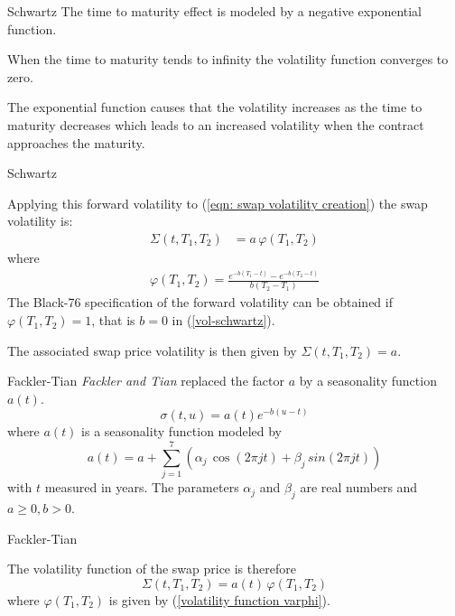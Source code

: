 {Schwartz}
The time to maturity effect is modeled by a negative exponential function.






	When the time to maturity tends to infinity the volatility function converges to zero.


	The exponential function causes that the volatility increases as the time to maturity decreases which leads to an increased volatility when the contract approaches the maturity.





{Schwartz}

Applying this forward volatility to (\ref{eqn: swap volatility creation}) the swap volatility is:
\begin{align}
\Sigma(t,T_1,T_2)&=a\,\varphi(T_1,T_2)
\end{align}
where
\begin{align}
\varphi(T_1,T_2)= \frac{e^{-b(T_1-t)}-e^{-b(T_2-t)}}{b(T_2-T_1)}
\label{volatility function varphi}
\end{align}
The Black-76 specification of the forward volatility can be obtained if $\varphi(T_1,T_2) =1$, that is $b=0$
in (\ref{vol-schwartz}).

The associated swap price volatility is then given by $\Sigma(t,T_1,T_2)=a$.

{Fackler-Tian}
\emph{Fackler and Tian}  replaced the factor $a$ by a seasonality function $a(t)$.
\begin{equation}
\sigma(t,u) = a(t)e^{-b(u-t)}
\end{equation}
where $a(t)$ is a seasonality function modeled by
\begin{equation}
a(t)=a+\sum_{j=1}^{7}(\alpha_j\, \cos(2\pi jt)+ \beta_j \, sin(2\pi jt)) \label{seasonality function}
\end{equation}
with $t$  measured in years. The parameters $\alpha_j$ and $\beta_j$ are real numbers and $a \ge 0, b > 0$.

{Fackler-Tian}

The volatility function of the swap price is therefore
\begin{equation}
\Sigma(t,T_1,T_2)=a(t)\, \varphi(T_1,T_2)
\end{equation}
where $\varphi(T_1,T_2)$ is given by (\ref{volatility function varphi}).\\

